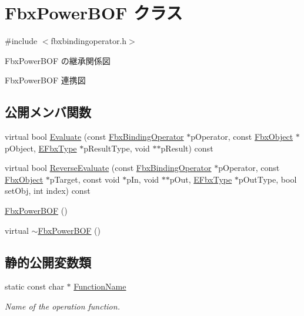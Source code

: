 \hypertarget{class_fbx_power_b_o_f}{}\section{Fbx\+Power\+B\+OF クラス}
\label{class_fbx_power_b_o_f}


{\ttfamily \#include $<$fbxbindingoperator.\+h$>$}



Fbx\+Power\+B\+OF の継承関係図


Fbx\+Power\+B\+OF 連携図
\subsection*{公開メンバ関数}
\begin{DoxyCompactItemize}
\item 
virtual bool \hyperlink{class_fbx_power_b_o_f_a6e8bfdde2e9ec733432c9ec7a9ef7195}{Evaluate} (const \hyperlink{class_fbx_binding_operator}{Fbx\+Binding\+Operator} $\ast$p\+Operator, const \hyperlink{class_fbx_object}{Fbx\+Object} $\ast$p\+Object, \hyperlink{fbxpropertytypes_8h_a73913a5ddfb20e57c6f25e9e6784bd92}{E\+Fbx\+Type} $\ast$p\+Result\+Type, void $\ast$$\ast$p\+Result) const
\item 
virtual bool \hyperlink{class_fbx_power_b_o_f_a6117db8807508595bbe95de7e547cad3}{Reverse\+Evaluate} (const \hyperlink{class_fbx_binding_operator}{Fbx\+Binding\+Operator} $\ast$p\+Operator, const \hyperlink{class_fbx_object}{Fbx\+Object} $\ast$p\+Target, const void $\ast$p\+In, void $\ast$$\ast$p\+Out, \hyperlink{fbxpropertytypes_8h_a73913a5ddfb20e57c6f25e9e6784bd92}{E\+Fbx\+Type} $\ast$p\+Out\+Type, bool set\+Obj, int index) const
\item 
\hyperlink{class_fbx_power_b_o_f_a7b43e79a346342fd463b3c29291cc469}{Fbx\+Power\+B\+OF} ()
\item 
virtual \hyperlink{class_fbx_power_b_o_f_a1843470d60013a08ea062411a85f9f01}{$\sim$\+Fbx\+Power\+B\+OF} ()
\end{DoxyCompactItemize}
\subsection*{静的公開変数類}
\begin{DoxyCompactItemize}
\item 
static const char $\ast$ \hyperlink{class_fbx_power_b_o_f_a1201076a74abe5321aeafafcd4b65f63}{Function\+Name}
\begin{DoxyCompactList}\small\item\em Name of the operation function. \end{DoxyCompactList}\end{DoxyCompactItemize}


